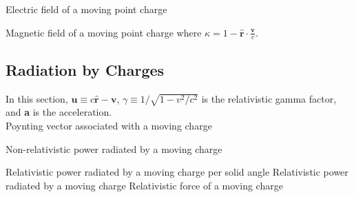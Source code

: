 \noindent
Electric field of a moving point charge 

\noindent
Magnetic field of a moving point charge 
\indent where $ \kappa = 1 - \boldsymbol{\hat{r}} \cdot \frac{\textbf{v}}{c}$.

\subsection{Radiation by Charges}
In this section, $\textbf{u} \equiv c \hat{\textbf{r}} - \textbf{v}$, $\gamma \equiv 1/ \sqrt{1- v^{2}/c^{2}}$ is the relativistic gamma
factor, and \textbf{a} is the acceleration.\\

\noindent Poynting vector associated with a moving charge 

\noindent Non-relativistic power radiated by a moving charge 

\noindent Relativistic power radiated by a moving charge per solid angle 
Relativistic power radiated by a moving charge
Relativistic force of a moving charge 


